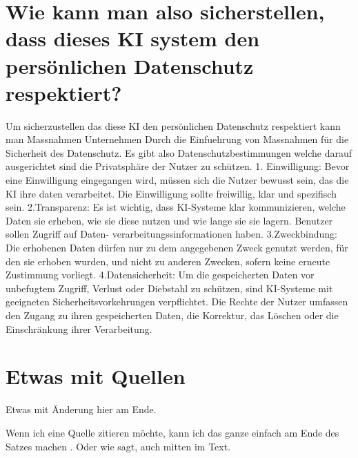 \documentclass{report}
\begin{document}
\section{Wie kann man also sicherstellen, dass dieses KI system den persönlichen Datenschutz respektiert?}
Um sicherzustellen das diese KI den persönlichen Datenschutz respektiert kann man Massnahmen Unternehmen
Durch die Einfuehrung von Massnahmen für die Sicherheit des Datenschutz.
Es gibt also Datenschutzbestimmungen welche darauf ausgerichtet sind die Privatsphäre der Nutzer zu schützen.
1. Einwilligung: Bevor eine Einwilligung eingegangen wird, müssen sich die Nutzer bewusst sein, das die KI ihre daten verarbeitet.
Die Einwilligung sollte freiwillig, klar und spezifisch sein.
2.Transparenz: Es ist wichtig, dass KI-Systeme klar kommunizieren, welche Daten sie erheben, wie sie diese nutzen und wie lange sie sie lagern. Benutzer sollen Zugriff auf Daten-
verarbeitungssinformationen haben.
3.Zweckbindung: Die erhobenen Daten dürfen nur zu dem angegebenen Zweck genutzt werden, für den sie erhoben wurden, und nicht zu anderen Zwecken, sofern keine erneute Zustimmung vorliegt.
4.Datensicherheit: Um die gespeicherten Daten vor unbefugtem Zugriff, Verlust oder Diebstahl zu schützen, sind KI-Systeme mit geeigneten Sicherheitsvorkehrungen verpflichtet.
Die Rechte der Nutzer umfassen den Zugang zu ihren gespeicherten Daten, die Korrektur, das Löschen oder die Einschränkung ihrer Verarbeitung.







\section{Etwas mit Quellen}

Etwas mit Änderung hier am Ende.

Wenn ich eine Quelle zitieren möchte, kann ich das ganze einfach am Ende des Satzes machen \citep{example}. Oder wie \citet{example} sagt, auch mitten im Text.

\printbibliography
\end{document}
